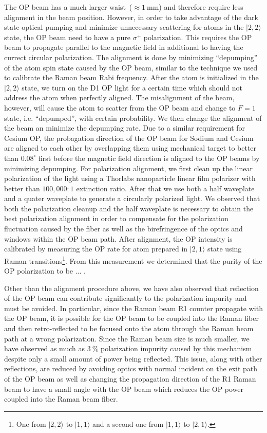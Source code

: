The OP beam has a much larger waist~($\approx1~\mathrm{mm}$)
and therefore require less alignment in the beam position.
However, in order to take advantage of the dark state optical pumping and
minimize unnecessary scattering for atoms in the $|2,2\rangle$ state,
the OP beam need to have a pure $\sigma^+$ polarization.
This requires the OP beam to propagate parallel to the magnetic field
in additional to having the currect circular polarization.
The alignment is done by minimizing ``depumping'' of the atom spin state caused by the OP beam,
similar to the technique we used to calibrate the Raman beam Rabi frequency.
After the atom is initialized in the $|2,2\rangle$ state, we turn on the D1 OP light
for a certain time which should not address the atom when perfectly aligned.
The misalignment of the beam, however, will cause the atom to scatter from the OP beam
and change to $F=1$ state, i.e. ``depumped'', with certain probability.
We then change the alignment of the beam an minimize the depumping rate.
Due to a similar requirement for Cesium OP, the probagation direction of
the OP beam for Sodium and Cesium are aligned to each other by overlapping them
using mechanical target to better than $0.08^\circ$ first
before the magnetic field direction is aligned to the OP beams by minimizing depumping.
For polarization alignment, we first clean up the linear polarization of the light
using a Thorlabs nanoparticle linear film polarizer with better than $100,000:1$
extinction ratio. After that we use both a half waveplate and a quater waveplate
to generate a circularly polarized light.
We observed that both the polarization cleanup and the half waveplate is necessary
to obtain the best polarization alignment in order to compensate for the polarization
fluctuation caused by the fiber as well as the birefringence of the optics and windows
within the OP beam path. After alignment, the OP intensity is calibrated
by measuring the OP rate for atom prepared in $|2,1\rangle$ state
using Raman transitions\footnote{One from $|2,2\rangle$ to $|1,1\rangle$
  and a second one from $|1,1\rangle$ to $|2,1\rangle$.}.
From this measurement we determined that the purity of the OP polarization
to be ... .

Other than the alignment procedure above, we have also observed that reflection
of the OP beam can contribute significantly to the polarization impurity and
must be avoided. In particular, since the Raman beam R1 counter propagate with the OP beam,
it is possible for the OP beam to be coupled into the Raman fiber and then retro-reflected
to be focused onto the atom through the Raman beam path at a wrong polarization.
Since the Raman beam size is much smaller, we have observed as much as $3~\mathrm{\%}$
polarization impurity caused by this mechanism despite only a small amount of
power being reflected. This issue, along with other reflections,
are reduced by avoiding optics with normal incident on the exit path of the OP beam
as well as changing the propagation direction of the R1 Raman beam
to have a small angle with the OP beam which reduces the OP power coupled into
the Raman beam fiber.

